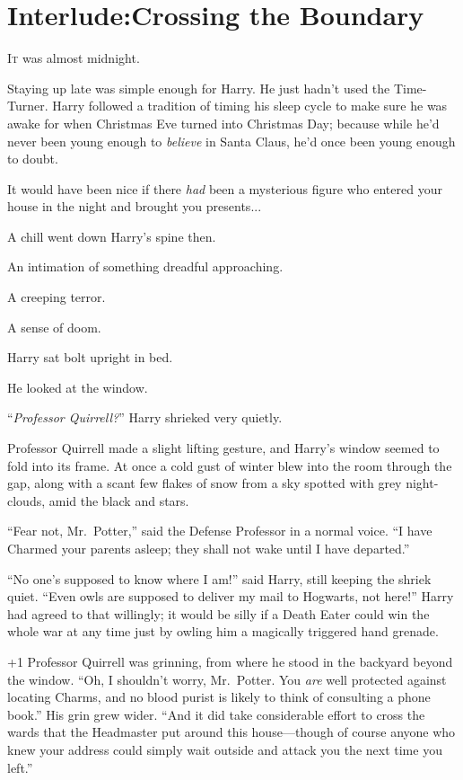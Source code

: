\chapter[Interlude: Crossing~the~Boundary]{Interlude:\protect\linebreak{}Crossing the Boundary}

\lettrine{I}{t} was almost midnight.

\quad\quad Staying up late was simple enough for Harry. He just hadn’t used the Time-Turner. Harry followed a tradition of timing his sleep cycle to make sure he was awake for when Christmas Eve turned into Christmas Day; because while he’d never been young enough to \emph{believe} in Santa Claus, he’d once been young enough to doubt.

It would have been nice if there \emph{had} been a mysterious figure who entered your house in the night and brought you presents...

A chill went down Harry’s spine then.

An intimation of something dreadful approaching.

A creeping terror.

A sense of doom.

Harry sat bolt upright in bed.

He looked at the window.

“\emph{Professor Quirrell?}” Harry shrieked very quietly.

Professor Quirrell made a slight lifting gesture, and Harry’s window seemed to fold into its frame. At once a cold gust of winter blew into the room through the gap, along with a scant few flakes of snow from a sky spotted with grey night-clouds, amid the black and stars.

“Fear not, Mr.~Potter,” said the Defense Professor in a normal voice. “I have Charmed your parents asleep; they shall not wake until I have departed.”

“No one’s supposed to know where I am!” said Harry, still keeping the shriek quiet. “Even owls are supposed to deliver my mail to Hogwarts, not here!” Harry had agreed to that willingly; it would be silly if a Death Eater could win the whole war at any time just by owling him a magically triggered hand grenade.

\looseness+1 Professor Quirrell was grinning, from where he stood in the backyard beyond the window. “Oh, I shouldn’t worry, Mr.~Potter. You \emph{are} well protected against locating Charms, and no blood purist is likely to think of consulting a phone book.” His grin grew wider. “And it did take considerable effort to cross the wards that the Headmaster put around this house—though of course anyone who knew your address could simply wait outside and attack you the next time you left.”

